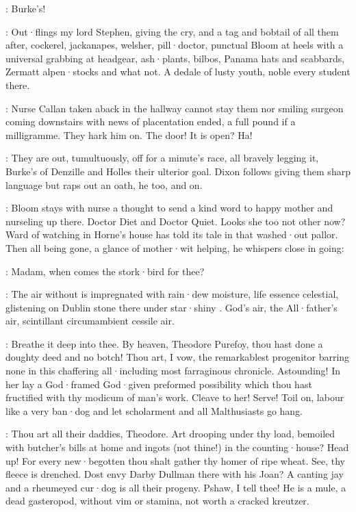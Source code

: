 
\stephen:
Burke's!

:
Out·flings my lord Stephen,
giving the cry,
and a tag and bobtail
of all them after,
cockerel,
jackanapes,
welsher,
pill·doctor,
punctual
Bloom at heels with a universal grabbing at headgear,
ash·plants,
bilbos,
Panama hats and scabbards,
Zermatt alpen·stocks and what not.
A dedale of
lusty youth,
noble every student there.

:
Nurse Callan taken aback in the hallway cannot stay them nor smiling
surgeon coming downstairs with news of placentation ended,
a full pound if
a milligramme.
They hark him on.
The door!
It is open?
Ha!

:
They are out,
tumultuously,
off for a minute's race,
all bravely
legging it,
Burke's of Denzille and Holles their ulterior goal.
Dixon follows giving them sharp language but raps out an oath,
he too,
and on.

:
Bloom stays with nurse a thought to send a kind word to happy mother and nurseling up there.
Doctor Diet and Doctor Quiet.
Looks she too not other now?
Ward of watching in Horne's house has told its tale in that washed·out pallor.
Then all being gone,
a glance of mother·wit helping,
he whispers close in going:

\Bloom:
Madam,
when comes the stork·bird for thee?

:
The air without is impregnated with rain·dew moisture,
life essence celestial,
glistening on Dublin stone there under star·shiny .
God's air,
the All·father's air,
scintillant circumambient cessile air.

:
Breathe it deep into thee.
By heaven,
Theodore Purefoy,
thou hast done a doughty deed and no botch!
Thou art,
I vow,
the remarkablest progenitor barring none in this chaffering all·including most farraginous chronicle.
Astounding!
In her lay a God·framed God·given preformed
possibility which thou hast fructified with thy modicum of man's work.
Cleave to her!
Serve!
Toil on,
labour like a very ban·dog and let scholarment and all Malthusiasts go hang.

:
Thou art all their daddies,
Theodore.
Art drooping
under thy load,
bemoiled with butcher's bills at home and ingots
(not thine!)
in the counting·house?
Head up!
For every new·begotten thou shalt
gather thy homer of ripe wheat.
See,
thy fleece is drenched.
Dost envy
Darby Dullman there with his Joan?
A canting jay and a rheumeyed cur·dog
is all their progeny.
Pshaw,
I tell thee!
He is a mule,
a dead
gasteropod,
without vim or stamina,
not worth a cracked kreutzer.

